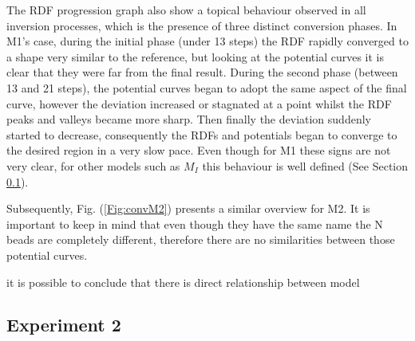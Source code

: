 \documentclass[10pt,a4paper,twoside]{article}
\begin{document}
The RDF progression graph also show a topical behaviour observed in all inversion processes, which is the presence of three distinct conversion phases. In M1's case, during the initial phase (under 13 steps) the RDF rapidly converged to a shape very similar to the reference, but looking at the potential curves it is clear that they were far from the final result. During the second phase (between 13 and 21 steps), the potential curves began to adopt the same aspect of the final curve, however the deviation increased or stagnated at a point whilst the RDF peaks and valleys became more sharp. Then finally the deviation suddenly started to decrease, consequently the RDFs and potentials began to converge to the desired region in a very slow pace. Even though for M1 these signs are not very clear, for other models such as $M_{I}$ this behaviour is well defined (See Section \ref{subsec:resexp2}).

Subsequently, Fig. (\ref{Fig:convM2}) presents a similar overview for M2. It is important to keep in mind that even though they have the same name the N beads are completely different, therefore there are no similarities between those potential curves. 

 it is possible to conclude that there is direct relationship between model 
\subsection{Experiment 2}
\label{subsec:resexp2}
\end{document}

